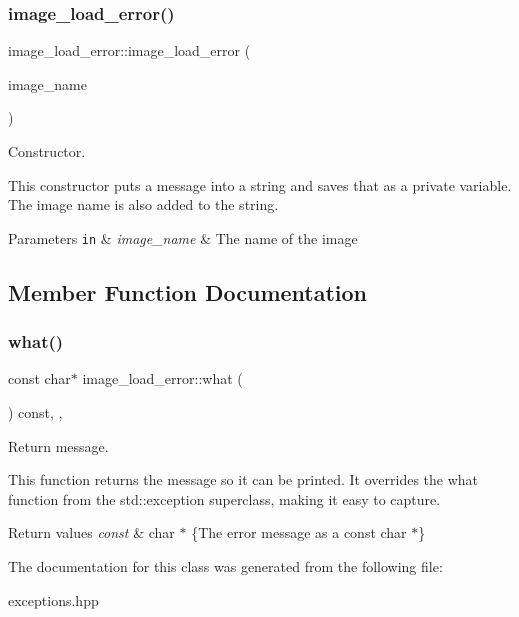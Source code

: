 \subsubsection{\texorpdfstring{image\+\_\+load\+\_\+error()}{image\_load\_error()}}
{\footnotesize\ttfamily image\+\_\+load\+\_\+error\+::image\+\_\+load\+\_\+error (\begin{DoxyParamCaption}\item[{const std\+::string \&}]{image\+\_\+name }\end{DoxyParamCaption})\hspace{0.3cm}{\ttfamily [inline]}}



Constructor. 

This constructor puts a message into a string and saves that as a private variable. The image name is also added to the string.


\begin{DoxyParams}[1]{Parameters}
\mbox{\tt in}  & {\em image\+\_\+name} & The name of the image \\
\hline
\end{DoxyParams}


\subsection{Member Function Documentation}
\mbox{\label{classimage__load__error_ab73fa8f110ff313005a7bb0ed66fd880}} 
\subsubsection{\texorpdfstring{what()}{what()}}
{\footnotesize\ttfamily const char$\ast$ image\+\_\+load\+\_\+error\+::what (\begin{DoxyParamCaption}{ }\end{DoxyParamCaption}) const\hspace{0.3cm}{\ttfamily [inline]}, {\ttfamily [override]}, {\ttfamily [noexcept]}}



Return message. 

This function returns the message so it can be printed. It overrides the what function from the std\+::exception superclass, making it easy to capture.


\begin{DoxyRetVals}{Return values}
{\em const} & char $\ast$ \{The error message as a const char $\ast$\} \\
\hline
\end{DoxyRetVals}


The documentation for this class was generated from the following file\+:\begin{DoxyCompactItemize}
\item 
exceptions.\+hpp\end{DoxyCompactItemize}
